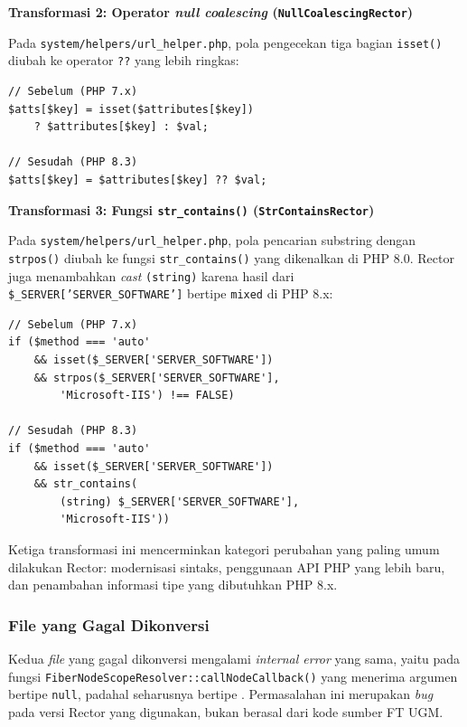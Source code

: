 \noindent\begin{minipage}{\linewidth}
\textbf{Transformasi 2: Operator \textit{null coalescing} (\texttt{NullCoalescingRector})}

Pada \texttt{system/helpers/url\_helper.php}, pola pengecekan tiga bagian \texttt{isset()} diubah ke operator \texttt{??} yang lebih ringkas:

\begin{lstlisting}[style=promptstyle]
// Sebelum (PHP 7.x)
$atts[$key] = isset($attributes[$key])
    ? $attributes[$key] : $val;

// Sesudah (PHP 8.3)
$atts[$key] = $attributes[$key] ?? $val;
\end{lstlisting}
\end{minipage}

\noindent\begin{minipage}{\linewidth}
\textbf{Transformasi 3: Fungsi \texttt{str\_contains()} (\texttt{StrContainsRector})}

Pada \texttt{system/helpers/url\_helper.php}, pola pencarian substring dengan \texttt{strpos()} diubah ke fungsi \texttt{str\_contains()} yang dikenalkan di PHP 8.0. Rector juga menambahkan \textit{cast} \texttt{(string)} karena hasil dari \texttt{\$\_SERVER['SERVER\_SOFTWARE']} bertipe \texttt{mixed} di PHP 8.x:

\begin{lstlisting}[style=promptstyle]
// Sebelum (PHP 7.x)
if ($method === 'auto'
    && isset($_SERVER['SERVER_SOFTWARE'])
    && strpos($_SERVER['SERVER_SOFTWARE'],
        'Microsoft-IIS') !== FALSE)

// Sesudah (PHP 8.3)
if ($method === 'auto'
    && isset($_SERVER['SERVER_SOFTWARE'])
    && str_contains(
        (string) $_SERVER['SERVER_SOFTWARE'],
        'Microsoft-IIS'))
\end{lstlisting}
\end{minipage}
Ketiga transformasi ini mencerminkan kategori perubahan yang paling umum dilakukan Rector: modernisasi sintaks, penggunaan API PHP yang lebih baru, dan penambahan informasi tipe yang dibutuhkan PHP 8.x.

\subsubsection{File yang Gagal Dikonversi}

Kedua \textit{file} yang gagal dikonversi mengalami \textit{internal error} yang sama, yaitu pada fungsi \texttt{FiberNodeScopeResolver::callNodeCallback()} yang menerima argumen bertipe \texttt{null}, padahal seharusnya bertipe \texttt{}. Permasalahan ini merupakan \textit{bug} pada versi Rector yang digunakan, bukan berasal dari kode sumber FT UGM.


